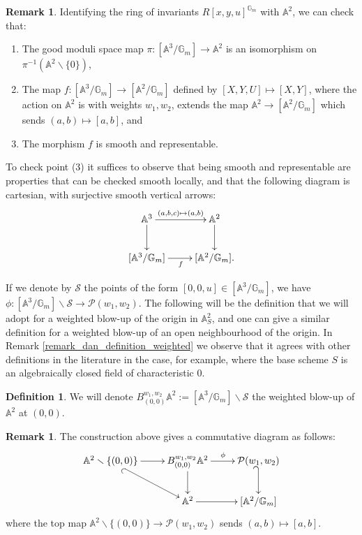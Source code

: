 \documentclass[11pt]{amsart}
\theoremstyle{definition}
\newtheorem{definition}[theorem]{Definition}
\newtheorem{remark}[theorem]{Remark}
\theoremstyle{remark}
\newcommand{\bA}{{\mathbb A}}
\newcommand{\calP}{\mathcal P}
\newcommand{\sS}{\mathscr{S}}
\newcommand{\bG}{\mathbb{G}}
\begin{document}
\begin{remark}\label{remark quote pt 2}
Identifying the ring of invariants $R[x,y,u]^{\bG_m}$ with $\bA^2$, we can check that:
\begin{enumerate}
    \item The good moduli space map $\pi:[\mathbb{A}^3/\bG_m]\to \mathbb{A}^2$ is an isomorphism on $\pi^{-1}(\mathbb{A}^2\smallsetminus\{0\})$,
    \item The map $f:[\mathbb{A}^3/\bG_m]\to [\mathbb{A}^2/\bG_m]$ defined by $[X,Y,U]\mapsto [X,Y]$, where the action on $\mathbb{A}^2$ is with weights $w_1,w_2$, extends the map $\mathbb{A}^2 \to [\mathbb{A}^2/\bG_m]$ which sends $(a,b)\mapsto [a,b]$, and
    \item The morphism $f$ is smooth and representable.
\end{enumerate}
\end{remark} 
To check point (3) it suffices to observe that being smooth and representable are properties that can be checked smooth locally, and that the following diagram is cartesian, with surjective smooth vertical arrows:
$$\xymatrix{\mathbb{A}^3 \ar[d] \ar[r]^{(a,b,c)\mapsto (a,b)} & \mathbb{A}^2 \ar[d] \\[\mathbb{A}^3/\bG_m] \ar[r]_f & [\mathbb{A}^2/\bG_m].}$$

If we denote by $\sS$ the points of the form $[0,0,u]\in [\mathbb{A}^3/\bG_m]$, we have
$\phi: [\mathbb{A}^3/\bG_m]\smallsetminus \sS \to \calP(w_1,w_2)$.
The following will be the definition that we will adopt for a weighted blow-up of the origin in $\bA^2_S$, and one can give a similar definition for a weighted blow-up of an open neighbourhood of the origin. In Remark \ref{remark_dan_definition_weighted} we observe that it agrees with other definitions in the literature in the case, for example, where the base scheme $S$ is an algebraically closed field of characteristic 0.
\begin{definition}
We will denote  $B^{w_1,w_2}_{(0,0)}\mathbb{A}^2 := [\mathbb{A}^3/\bG_m]\smallsetminus \sS$ the weighted blow-up of $\mathbb{A}^2$ at $(0,0)$.
\end{definition}
\begin{remark}\label{remark map A2 to Pw1,w2} The construction above gives a commutative diagram as follows:
$$\xymatrix{\mathbb{A}^2\smallsetminus \{(0,0)\} \ar[r] \ar@{_{(}->}[dr]& B^{w_1,w_2}_{(0,0)}\mathbb{A}^2 \ar[d] \ar[r]^{\phi} & \calP(w_1,w_2) \ar@{_{(}->}[d]\\ & \mathbb{A}^2 \ar[r] & [\bA^2/\bG_m] }$$
where the top map $\mathbb{A}^2\smallsetminus\{(0,0)\} \to \calP(w_1,w_2)$ sends $(a,b)\mapsto [a,b]$.
\end{remark}
\end{document}
